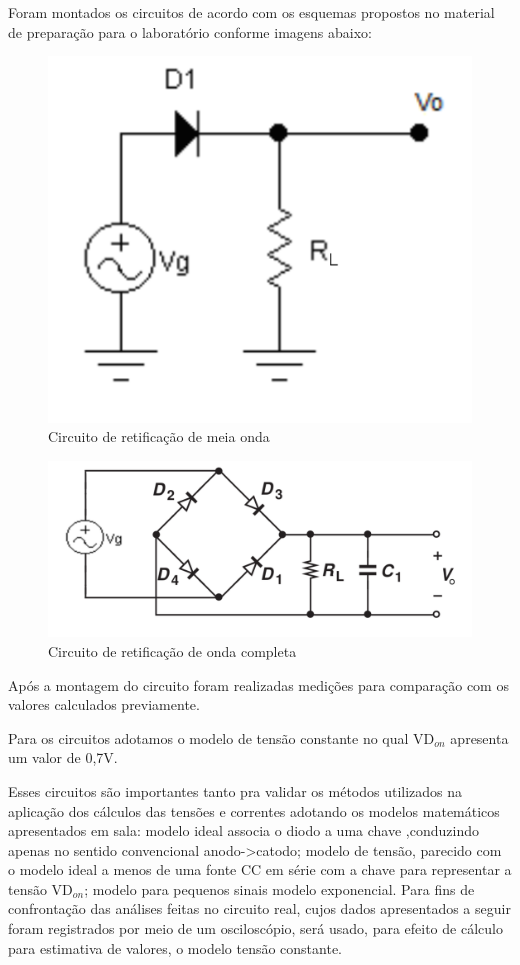 Foram montados os circuitos de acordo com os esquemas propostos no material de preparação para o laboratório conforme imagens abaixo:

\begin{figure}[!ht]
\label{meia}
\includegraphics[width=0.5\linewidth]{meia.png}
\caption{Circuito de retificação de meia onda}
\end{figure}

\begin{figure}[!ht]
\label{completa}
\includegraphics[width=0.5\linewidth]{completa.png}
\caption{Circuito de retificação de onda completa}

\end{figure}

Após a montagem do circuito foram realizadas medições para comparação com os valores calculados previamente.

Para os circuitos adotamos o modelo de tensão constante no qual VD$_{on}$ apresenta um valor de 0,7V. 

Esses circuitos são importantes tanto pra validar os métodos utilizados na aplicação dos cálculos das tensões e correntes adotando os modelos matemáticos apresentados em sala: modelo ideal associa o diodo a uma chave ,conduzindo apenas no sentido convencional anodo->catodo; modelo de tensão, parecido com o modelo ideal a menos de uma fonte CC em série com a chave para representar a tensão VD$_{on}$; modelo para pequenos sinais modelo exponencial.
Para fins de confrontação das análises feitas no circuito real, cujos dados apresentados a seguir foram registrados por meio de um osciloscópio, será usado, para efeito de cálculo para estimativa de valores, o modelo tensão constante.

